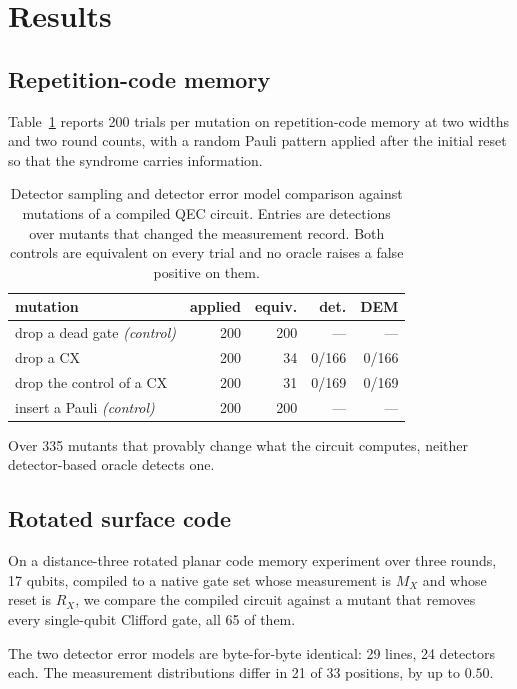 \documentclass[twocolumn,10pt]{article}
\begin{document}
\section{Results}

\subsection{Repetition-code memory}

Table~\ref{tab:main} reports 200 trials per mutation on repetition-code memory
at two widths and two round counts, with a random Pauli pattern applied after
the initial reset so that the syndrome carries information.

\begin{table}[t]
\centering
\small
\begin{tabular}{lrrrr}
\toprule
mutation & applied & equiv. & det. & DEM \\
\midrule
drop a dead gate \emph{(control)} & 200 & 200 & --- & --- \\
drop a CX & 200 & 34 & 0/166 & 0/166 \\
drop the control of a CX & 200 & 31 & 0/169 & 0/169 \\
insert a Pauli \emph{(control)} & 200 & 200 & --- & --- \\
\bottomrule
\end{tabular}
\caption{Detector sampling and detector error model comparison against mutations
of a compiled QEC circuit. Entries are detections over mutants that changed the
measurement record. Both controls are equivalent on every trial and no oracle
raises a false positive on them.}
\label{tab:main}
\end{table}

Over 335 mutants that provably change what the circuit computes, neither
detector-based oracle detects one.

\subsection{Rotated surface code}

On a distance-three rotated planar code memory experiment over three rounds, 17
qubits, compiled to a native gate set whose measurement is $M_X$ and whose reset
is $R_X$, we compare the compiled circuit against a mutant that removes every
single-qubit Clifford gate, all 65 of them.

The two detector error models are byte-for-byte identical: 29 lines, 24
detectors each. The measurement distributions differ in 21 of 33 positions, by
up to $0.50$.
\end{document}

